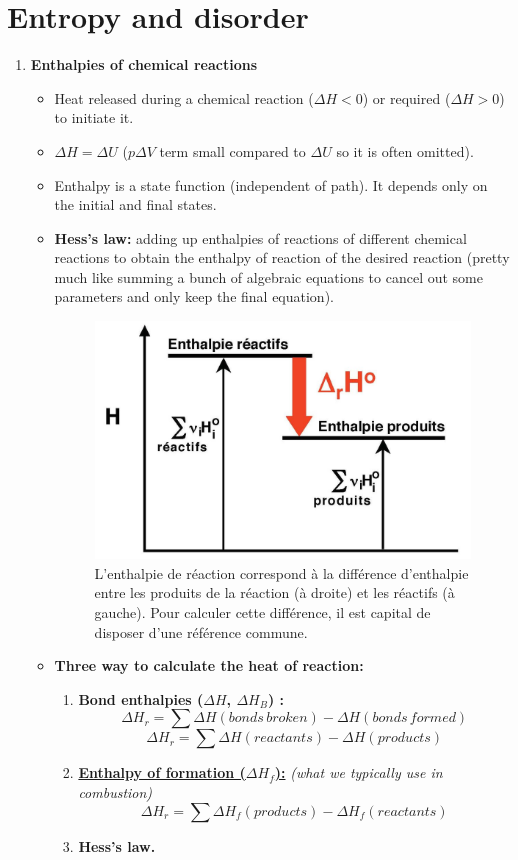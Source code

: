 \documentclass[a4paper,11pt]{article}
\begin{document}
\section{Entropy and disorder}
\begin{enumerate}
\item \textbf{Enthalpies of chemical reactions}
\noindent    
\begin{itemize}
\[\Delta H = H_f - H_i \]
\item Heat released during a chemical reaction ($\Delta H<0$) or required ($\Delta H>0$) to initiate it.
\item $\Delta H = \Delta U$ ($p \Delta V$ term small compared to $\Delta U$ so it is often omitted).
\item Enthalpy is a state function (independent of path). It depends only on the initial and final states.
\item \textbf{Hess's law:} adding up enthalpies of reactions of different chemical reactions to obtain the enthalpy of reaction of the desired reaction (pretty much like summing a bunch of algebraic equations to cancel out some parameters and only keep the final equation).
\begin{figure}[h]
\centering                \includegraphics[width=.4\linewidth]{figures/EtatRefEnthalpie.jpeg}
\caption{L'enthalpie de réaction correspond à la différence d'enthalpie entre les produits de la réaction (à droite) et les réactifs (à gauche). Pour calculer cette différence, il est capital de disposer d'une référence commune.}
\end{figure}
\item \textbf{Three way to calculate the heat of reaction:}
\begin{enumerate}
    \item \textbf{Bond enthalpies ($\Delta H$, $\Delta H_B$) :} 
    \[\Delta H_r = \sum \Delta H(bonds \,broken) - \Delta H(bonds\, formed)\]
    \[\Delta H_r = \sum \Delta H(reactants) - \Delta H(products)\]
    
    \item \underline{\textbf{Enthalpy of formation ($\Delta H_f$):}} \emph{(what we typically use in combustion)}
    \[\Delta H_r = \sum \Delta H_f(products) - \Delta H_f(reactants)\]
    \item \textbf{Hess's law.}
\end{enumerate}


\end{itemize}
\end{enumerate}
\end{document}
